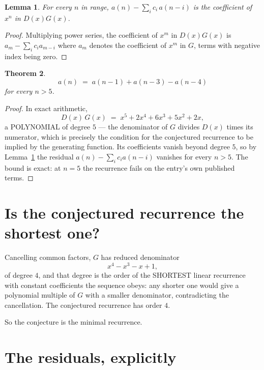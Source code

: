 \documentclass[11pt,a4paper]{article}
\theoremstyle{plain}
\newtheorem{theorem}{Theorem}
\newtheorem{lemma}[theorem]{Lemma}
\theoremstyle{definition}
\begin{document}
\begin{lemma}\label{lem:key}
For every $n$ in range, $a(n)-\sum_i c_i\,a(n-i)$ is the coefficient of $x^{n}$ in
$D(x)G(x)$.
\end{lemma}

\begin{proof}
Multiplying power series, the coefficient of $x^{m}$ in $D(x)G(x)$ is
$a_m-\sum_i c_i a_{m-i}$ where $a_m$ denotes the coefficient of $x^{m}$ in $G$, terms with
negative index being zero.
\end{proof}

\begin{theorem}
\[
a(n)\;=\;a(n-1) + a(n-3) - a(n-4)
\]
for every $n>5$.
\end{theorem}

\begin{proof}
In exact arithmetic,
\[
D(x)\,G(x)\;=\;x^{5} + 2 x^{4} + 6 x^{3} + 5 x^{2} + 2 x,
\]
a POLYNOMIAL of degree $5$ --- the denominator of $G$ divides $D(x)$ times its numerator,
which is precisely the condition for the conjectured recurrence to be implied by the
generating function. Its coefficients vanish beyond degree $5$, so by
Lemma~\ref{lem:key} the residual $a(n)-\sum_ic_ia(n-i)$ vanishes for every
$n>5$. The bound is exact: at $n=5$ the recurrence fails on the entry's own published terms.
\end{proof}

\section{Is the conjectured recurrence the shortest one?}

Cancelling common factors, $G$ has reduced denominator
\[
x^{4} - x^{3} - x + 1,
\]
of degree $4$, and that degree is the order of the SHORTEST linear recurrence with
constant coefficients the sequence obeys: any shorter one would give a polynomial multiple of
$G$ with a smaller denominator, contradicting the cancellation. The conjectured recurrence has
order $4$.

So the conjecture is the minimal recurrence.

\section{The residuals, explicitly}
\end{document}
